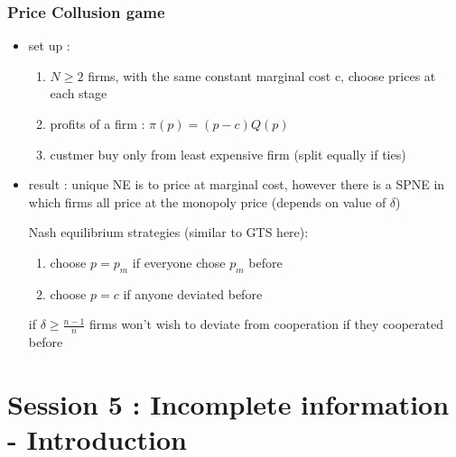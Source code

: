 \documentclass{article}
\begin{document}
\subsubsection{Price Collusion game}
\begin{itemize}
    \item set up : 
    \begin{enumerate}
        \item $N\geq 2$ firms, with the same constant marginal cost c, choose prices at each stage
        \item profits of a firm : $\pi(p) = (p-c)Q(p)$
        \item custmer buy only from least expensive firm (split equally if ties)
    \end{enumerate}
    \item result : unique NE is to price at marginal cost, however there is a SPNE in which firms all price at the monopoly price (depends on value of $\delta$)
\begin{Proof}
    Nash equilibrium strategies (similar to GTS here): 
    \begin{enumerate}
        \item choose $p=p_m$ if everyone chose $p_m$ before
        \item choose $p=c$ if anyone deviated before
    \end{enumerate}
    if $\delta \geq \frac{n-1}{n}$ firms won't wish to deviate from cooperation if they cooperated before 
\end{Proof}
\end{itemize}

\section{Session 5  : Incomplete information - Introduction }
\end{document}
